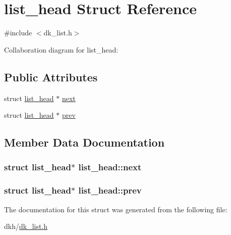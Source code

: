 \hypertarget{structlist__head}{\section{list\+\_\+head Struct Reference}
\label{structlist__head}
}


{\ttfamily \#include $<$dk\+\_\+list.\+h$>$}



Collaboration diagram for list\+\_\+head\+:
\subsection*{Public Attributes}
\begin{DoxyCompactItemize}
\item 
struct \hyperlink{structlist__head}{list\+\_\+head} $\ast$ \hyperlink{structlist__head_ac3b0ff0dfb978a0cfbdad6b9d19cdcfe}{next}
\item 
struct \hyperlink{structlist__head}{list\+\_\+head} $\ast$ \hyperlink{structlist__head_ae4298f7975979e5f6bb406c40c1fa443}{prev}
\end{DoxyCompactItemize}


\subsection{Member Data Documentation}
\hypertarget{structlist__head_ac3b0ff0dfb978a0cfbdad6b9d19cdcfe}{
\subsubsection[{next}]{\setlength{\rightskip}{0pt plus 5cm}struct {\bf list\+\_\+head}$\ast$ list\+\_\+head\+::next}}\label{structlist__head_ac3b0ff0dfb978a0cfbdad6b9d19cdcfe}
\hypertarget{structlist__head_ae4298f7975979e5f6bb406c40c1fa443}{
\subsubsection[{prev}]{\setlength{\rightskip}{0pt plus 5cm}struct {\bf list\+\_\+head}$\ast$ list\+\_\+head\+::prev}}\label{structlist__head_ae4298f7975979e5f6bb406c40c1fa443}


The documentation for this struct was generated from the following file\+:\begin{DoxyCompactItemize}
\item 
dkh/\hyperlink{dk__list_8h}{dk\+\_\+list.\+h}\end{DoxyCompactItemize}
